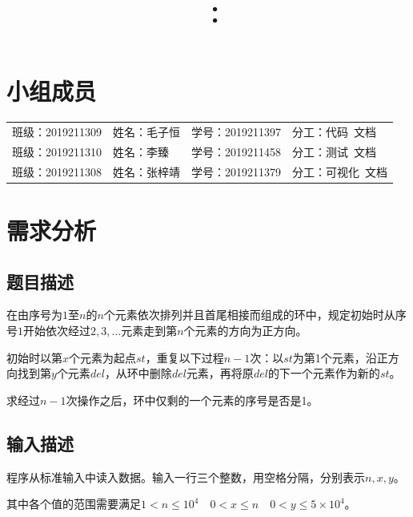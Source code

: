 \documentclass{article}
\title{\hmwkClass\ ：\hmwkTitle}
\author{\hmwkAuthorName}
\begin{document}
\maketitle  

\section*{小组成员}

\setlength{\tabcolsep}{9mm}
{
    \begin{table}[htbp]
        \centering
        \begin{tabular}{llll}
            班级：2019211309 & 姓名：毛子恒 & 学号：2019211397 & 分工：代码\ 文档   \\
            
            班级：2019211310 & 姓名：李臻   & 学号：2019211458 & 分工：测试\ 文档   \\
            
            班级：2019211308 & 姓名：张梓靖 & 学号：2019211379 & 分工：可视化\ 文档 \\
        \end{tabular}
    \end{table}
}

\tableofcontents
\newpage

\section{需求分析}

\subsection{题目描述}

在由序号为$1$至$n$的$n$个元素依次排列并且首尾相接而组成的环中，规定初始时从序号$1$开始依次经过$2,3,...$元素走到第$n$个元素的方向为正方向。

初始时以第$x$个元素为起点$st$，重复以下过程$n-1$次：以$st$为第1个元素，沿正方向找到第$y$个元素$del$，从环中删除$del$元素，再将原$del$的下一个元素作为新的$st$。

求经过$n-1$次操作之后，环中仅剩的一个元素的序号是否是1。

\subsection{输入描述}

程序从标准输入中读入数据。输入一行三个整数，用空格分隔，分别表示$n,x,y$。

其中各个值的范围需要满足$1 < n \leq 10^4\quad 0 < x \leq n\quad 0 < y \leq 5\times 10^4$。
\end{document}
